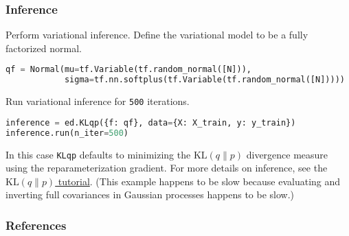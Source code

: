 \subsubsection{Inference}

Perform variational inference.
Define the variational model to be a fully factorized normal.
\begin{lstlisting}[language=Python]
qf = Normal(mu=tf.Variable(tf.random_normal([N])),
            sigma=tf.nn.softplus(tf.Variable(tf.random_normal([N]))))
\end{lstlisting}

Run variational inference for \texttt{500} iterations.
\begin{lstlisting}[language=Python]
inference = ed.KLqp({f: qf}, data={X: X_train, y: y_train})
inference.run(n_iter=500)
\end{lstlisting}
In this case
\texttt{KLqp} defaults to minimizing the
$\text{KL}(q\|p)$ divergence measure using the reparameterization
gradient.
For more details on inference, see the \href{/tutorials/klqp}{$\text{KL}(q\|p)$ tutorial}.
(This example happens to be slow because evaluating and inverting full
covariances in Gaussian processes happens to be slow.)


\subsubsection{References}\label{references}
